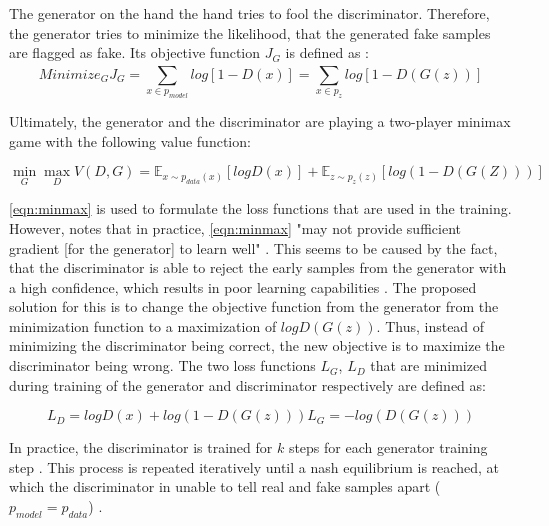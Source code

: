 The generator on the hand the hand tries to fool the discriminator.
Therefore, the generator tries to minimize the likelihood, that the generated fake samples are flagged as fake.
Its objective function $J_G$ is defined as \cite{aggarwal2018NeuralNetworksDeep}:
\begin{equation}
    \label{eqn:generator}
    Minimize_GJ_G= \sum_{x\in p_{model}}^{} log [1-D(x)] = \sum_{x\in p_z}^{} log [1-D(G(z))]
\end{equation}

Ultimately, the generator and the discriminator are playing a two-player minimax game with the following value function:

\begin{equation}
    \label{eqn:minmax}
    \min_G\max_DV(D,G)=\mathbb{E}_{x\sim p_{data}(x)} [log D(x)] + \mathbb{E}_{z\sim p_z(z)}[log( 1-D(G(Z)))]
\end{equation}

\autoref{eqn:minmax} is used to formulate the loss functions that are used in the training.
However, \cite{NIPS2014_5ca3e9b1} notes that in practice, \autoref{eqn:minmax} "may not provide sufficient gradient [for the generator] to learn well" \cite[p. 3]{NIPS2014_5ca3e9b1}.
This seems to be caused by the fact, that the discriminator is able to reject the early samples from the generator with a high confidence, which results in poor learning capabilities \cite{NIPS2014_5ca3e9b1}.
The proposed solution for this is to change the objective function from the generator from the minimization function  to a maximization of $logD(G(z))$.
Thus, instead of minimizing the discriminator being correct, the new objective is to maximize the discriminator being wrong. 
The two loss functions $L_G$, $L_D$ that are minimized during training of the generator and discriminator respectively are defined as:

\begin{equation}
  \label{eqn:gan-loss}
  L_D=logD(x)+log(1-D(G(z)))
  L_G=-log(D(G(z)))
\end{equation}

In practice, the discriminator is trained for $k$ steps for each generator training step \cite{aggarwal2018NeuralNetworksDeep}.
This process is repeated iteratively until a nash equilibrium is reached, at which the discriminator in unable to tell real and fake samples apart ($p_{model}=p_{data}$) \cite{NIPS2014_5ca3e9b1, aggarwal2018NeuralNetworksDeep}.



